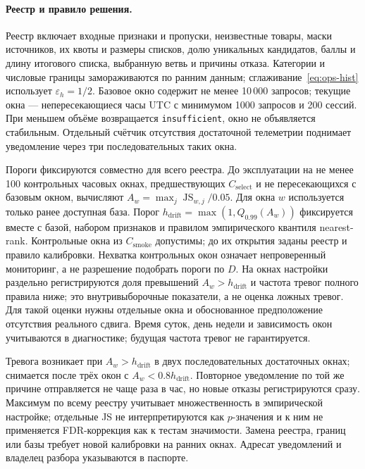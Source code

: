 \documentclass[12pt,a4paper]{article}
\newcommand{\code}[1]{{\ttfamily\small\nolinkurl{#1}}}
\newcommand{\eps}{\varepsilon}
\theoremstyle{plainru}
\begin{document}
\paragraph{Реестр и правило решения.}\label{sec:ops-drift-rule}
Реестр включает входные признаки и пропуски, неизвестные товары,
маски источников, их квоты и размеры списков, долю уникальных кандидатов,
баллы и длину итогового списка, выбранную ветвь и причины отказа.
Категории и числовые границы замораживаются по ранним данным;
сглаживание~\eqref{eq:ops-hist} использует $\eps_h=1/2$.
Базовое окно содержит не менее 10\,000 запросов; текущие окна ---
непересекающиеся часы UTC с минимумом 1000 запросов и 200 сессий.
При меньшем объёме возвращается \code{insufficient}, окно не объявляется
стабильным. Отдельный счётчик отсутствия достаточной телеметрии
поднимает уведомление через три последовательных таких окна.

Пороги фиксируются совместно для всего реестра. До эксплуатации
на не менее 100 контрольных часовых окнах, предшествующих
$C_{\mathrm{select}}$ и не пересекающихся с базовым окном, вычисляют
$A_w=\max_j\operatorname{JS}_{w,j}/0.05$. Для окна $w$ используется
только ранее доступная база. Порог
$h_{\mathrm{drift}}=\max(1,Q_{0.99}(A_w))$ фиксируется вместе
с базой, набором признаков и правилом эмпирического квантиля nearest-rank.
Контрольные окна из $C_{\mathrm{smoke}}$ допустимы; до их открытия
заданы реестр и правило калибровки. Нехватка контрольных окон
означает непроверенный мониторинг, а не разрешение подобрать пороги
по $D$. На окнах настройки раздельно регистрируются доля превышений
$A_w>h_{\mathrm{drift}}$ и частота тревог полного правила ниже;
это внутривыборочные показатели, а не оценка ложных тревог.
Для такой оценки нужны отдельные окна и обоснованное предположение
отсутствия реального сдвига. Время суток, день недели и зависимость
окон учитываются в диагностике; будущая частота тревог не гарантируется.

Тревога возникает при $A_w>h_{\mathrm{drift}}$ в двух последовательных
достаточных окнах; снимается после трёх окон с
$A_w<0.8h_{\mathrm{drift}}$. Повторное уведомление по той же причине
отправляется не чаще раза в час, но новые отказы регистрируются сразу.
Максимум по всему реестру учитывает множественность в эмпирической
настройке; отдельные JS не интерпретируются как $p$-значения
и к ним не применяется FDR-коррекция как к тестам значимости.
Замена реестра, границ или базы требует новой калибровки на ранних окнах.
Адресат уведомлений и владелец разбора указываются в паспорте.
\end{document}
